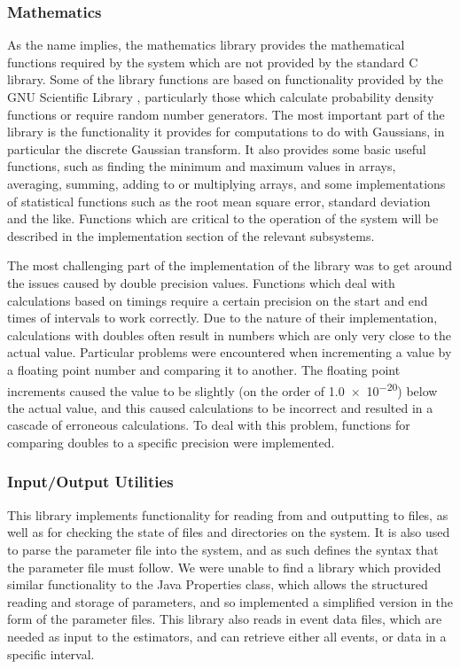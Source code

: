 \documentclass[a4paper,11pt]{article}
\begin{document}
\subsubsection{Mathematics}
\label{sec-3-3-2}

    As the name implies, the mathematics library provides the mathematical
    functions required by the system which are not provided by the standard C
    library. Some of the library functions are based on functionality provided
    by the GNU Scientific Library \cite{gsl}, particularly those which calculate
    probability density functions or require random number generators. The most
    important part of the library is the functionality it provides for
    computations to do with Gaussians, in particular the discrete Gaussian
    transform. It also provides some basic useful functions, such as finding the
    minimum and maximum values in arrays, averaging, summing, adding to or
    multiplying arrays, and some implementations of statistical functions such
    as the root mean square error, standard deviation and the like. Functions
    which are critical to the operation of the system will be described in the
    implementation section of the relevant subsystems.

    The most challenging part of the implementation of the library was to get
    around the issues caused by double precision values. Functions which deal
    with calculations based on timings require a certain precision on the start
    and end times of intervals to work correctly. Due to the nature of their
    implementation, calculations with doubles often result in numbers which are
    only very close to the actual value. Particular problems were encountered
    when incrementing a value by a floating point number and comparing it to
    another. The floating point increments caused the value to be slightly (on
    the order of \num{1.0e-20}) below the actual value, and this caused
    calculations to be incorrect and resulted in a cascade of erroneous
    calculations. To deal with this problem, functions for comparing doubles to
    a specific precision were implemented.
\subsubsection{Input/Output Utilities}
\label{sec-3-3-3}

    This library implements functionality for reading from and outputting to
    files, as well as for checking the state of files and directories on the
    system. It is also used to parse the parameter file into the system, and as
    such defines the syntax that the parameter file must follow. We were unable
    to find a library which provided similar functionality to the Java
    Properties class, which allows the structured reading and storage of
    parameters, and so implemented a simplified version in the form of the
    parameter files. This library also reads in event data files, which are
    needed as input to the estimators, and can retrieve either all events, or
    data in a specific interval.
\end{document}
